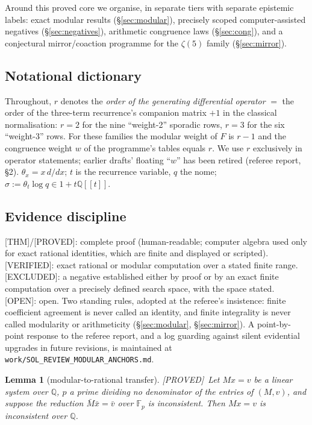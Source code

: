 \documentclass[11pt,reqno]{amsart}
\theoremstyle{plain}
\newtheorem{lemma}[theorem]{Lemma}
\theoremstyle{definition}
\theoremstyle{remark}
\newcommand{\Q}{\mathbb{Q}}
\newcommand{\tht}{\theta_t}
\newcommand{\Thm}{\textup{\textsf{[THM]}}}
\newcommand{\Proved}{\textup{\textsf{[PROVED]}}}
\newcommand{\Verified}{\textup{\textsf{[VERIFIED]}}}
\newcommand{\Excluded}{\textup{\textsf{[EXCLUDED]}}}
\newcommand{\Open}{\textup{\textsf{[OPEN]}}}
\begin{document}
Around this proved core we organise, in separate tiers with separate
epistemic labels: exact modular results (\S\ref{sec:modular}), precisely
scoped computer-assisted negatives (\S\ref{sec:negatives}), arithmetic
congruence laws (\S\ref{sec:cong}), and a conjectural mirror/coaction
programme for the $\zeta(5)$ family (\S\ref{sec:mirror}).

\subsection{Notational dictionary}\label{sec:dict}
Throughout, $r$ denotes the \emph{order of the generating differential
operator} $=$ the order of the three-term recurrence's companion matrix
$+1$ in the classical normalisation: $r=2$ for the nine ``weight-2''
sporadic rows, $r=3$ for the six ``weight-3'' rows. For these families the
modular weight of $F$ is $r-1$ and the congruence weight $w$ of the
programme's tables equals $r$. We use $r$ exclusively in operator
statements; earlier drafts' floating ``$w$'' has been retired
(referee report, \S2). $\theta_x=x\,d/dx$; $t$ is the recurrence variable,
$q$ the nome; $\sigma:=\tht\log q\in1+t\Q[[t]]$.

\subsection{Evidence discipline}\label{sec:labels}
\Thm/\Proved: complete proof (human-readable; computer algebra used only
for exact rational identities, which are finite and displayed or scripted).
\Verified: exact rational or modular computation over a stated finite
range. \Excluded: a negative established either by proof or by an exact
finite computation over a precisely defined search space, with the space
stated. \Open: open. Two standing rules, adopted at the referee's
insistence: finite coefficient agreement is never called an identity, and
finite integrality is never called modularity or arithmeticity
(\S\ref{sec:modular}, \S\ref{sec:mirror}). A point-by-point response to
the referee report, and a log guarding against silent evidential
upgrades in future revisions, is maintained at
\texttt{work/SOL\_REVIEW\_MODULAR\_ANCHORS.md}.

\begin{lemma}[modular-to-rational transfer]\label{lem:modrat}
\Proved\
Let $Mx=v$ be a linear system over $\Q$, $p$ a prime dividing no
denominator of the entries of $(M,v)$, and suppose the reduction
$\bar M\bar x=\bar v$ over $\mathbb F_p$ is inconsistent. Then $Mx=v$ is
inconsistent over $\Q$.
\end{lemma}
\end{document}
